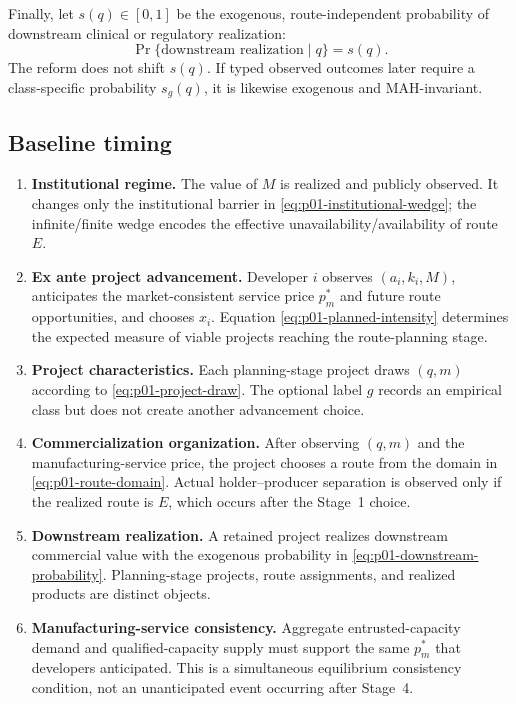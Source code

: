Finally, let \(s(q)\in[0,1]\) be the exogenous, route-independent probability
of downstream clinical or regulatory realization:
\begin{equation}
  \Pr\{\text{downstream realization}\mid q\}=s(q).
  \label{eq:p01-downstream-probability}
\end{equation}
The reform does not shift \(s(q)\).  If typed observed outcomes later require a
class-specific probability \(s_g(q)\), it is likewise exogenous and
MAH-invariant.

\subsection{Baseline timing}
\label{subsec:p01-timing}

\begin{enumerate}
  \item[Stage 0.] \textbf{Institutional regime.}  The value of \(M\) is
  realized and publicly observed.  It changes only the institutional barrier
  in \eqref{eq:p01-institutional-wedge}; the infinite/finite wedge encodes the
  effective unavailability/availability of route \(E\).

  \item[Stage 1.] \textbf{Ex ante project advancement.}  Developer \(i\)
  observes \((a_i,k_i,M)\), anticipates the market-consistent service price
  \(p_m^*\) and future route opportunities, and chooses \(x_i\).  Equation
  \eqref{eq:p01-planned-intensity} determines the expected measure of viable
  projects reaching the route-planning stage.

  \item[Stage 2.] \textbf{Project characteristics.}  Each planning-stage
  project draws \((q,m)\) according to \eqref{eq:p01-project-draw}.  The
  optional label \(g\) records an empirical class but does not create another
  advancement choice.

  \item[Stage 3.] \textbf{Commercialization organization.}  After observing
  \((q,m)\) and the manufacturing-service price, the project chooses a route
  from the domain in \eqref{eq:p01-route-domain}.  Actual holder--producer
  separation is observed only if the realized route is \(E\), which occurs
  after the Stage~1 choice.

  \item[Stage 4.] \textbf{Downstream realization.}  A retained project
  realizes downstream commercial value with the exogenous probability in
  \eqref{eq:p01-downstream-probability}.  Planning-stage projects, route
  assignments, and realized products are distinct objects.

  \item[Stage 5.] \textbf{Manufacturing-service consistency.}  Aggregate
  entrusted-capacity demand and qualified-capacity supply must support the same
  \(p_m^*\) that developers anticipated.  This is a simultaneous equilibrium
  consistency condition, not an unanticipated event occurring after Stage~4.
\end{enumerate}

